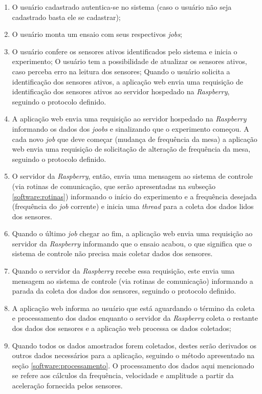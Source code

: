 \begin{enumerate}
 \item O usuário cadastrado autentica-se no sistema (caso o usuário não seja cadastrado basta ele se cadastrar);
 \item O usuário monta um ensaio com seus respectivos \textit{jobs};
 \item O usuário confere os sensores ativos identificados pelo sistema e inicia o experimento;
    \subitem O usuário tem a possibilidade de atualizar os sensores ativos, caso perceba erro na leitura dos sensores;
    \subitem Quando o usuário solicita a identificação dos sensores ativos, a aplicação web envia uma requisição
	     de identificação dos sensores ativos ao servidor hospedado na \textit{Raspberry}, seguindo o protocolo definido.
 \item A aplicação web envia uma requisição ao servidor hospedado na \textit{Raspberry} informando os dados dos \textit{joobs}
       e sinalizando que o experimento começou.
       \subitem A cada novo \textit{job} que deve começar (mudança de frequência da mesa) a aplicação web envia uma requisição
       de solicitação de alteração de frequência da mesa, seguindo o protocolo definido.
 \item O servidor da \textit{Raspberry}, então, envia uma mensagem ao sistema de controle (via rotinas de comunicação,
       que serão apresentadas na subseção \ref{software:rotinas}) informando o início do experimento e a frequência
       desejada (frequência do \textit{job} corrente) e inicia uma \textit{thread} para a coleta dos dados lidos dos sensores.
 \item Quando o último \textit{job} chegar ao fim, a aplicação web envia uma requisição ao servidor da \textit{Raspberry} informando
       que o ensaio acabou, o que significa que o sistema de controle não precisa mais coletar dados dos sensores.
 \item Quando o servidor da \textit{Raspberry} recebe essa requisição, este envia uma mensagem ao sistema de controle (via rotinas de comunicação)
       informando a parada da coleta dos dados dos sensores, seguindo o protocolo definido.
 \item A aplicação web informa ao usuário que está aguardando o término da coleta e processamento dos dados enquanto o servidor da
       \textit{Raspberry} coleta o restante dos dados dos sensores e a aplicação web processa os dados coletados;
 \item Quando todos os dados amostrados forem coletados, destes serão derivados os outros dados necessários para a aplicação, seguindo 
       o método apresentado na seção \ref{software:processamento}. O processamento dos dados aqui mencionado se refere aos cálculos da frequência,
       velocidade e amplitude a partir da aceleração fornecida pelos sensores.
\end{enumerate}



